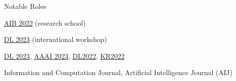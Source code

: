 %

\begin{rSection}{Notable Roles}
    \begin{description}[nosep]
        \item[Co-organiser:] \href{https://researchschool.w.uib.no/}{AIB 2022} (research school) 
        \item[Publicity co-chair:] \href{https://dl2023.w.uib.no/}{DL 2023} (international workshop)
        \item[PC member:]   \href{https://dl2023.w.uib.no/}{DL 2023}, \href{https://aaai.org/Conferences/AAAI-23/}{AAAI 2023}, \href{http://dl.kr.org/dl2022}{DL2022}, \href{https://kr2022.cs.tu-dortmund.de/}{KR2022}
        \item[Reviewer:] Information and Computation Journal, Artificial Intelligence Journal (AIJ)
    \end{description} 
\end{rSection}
